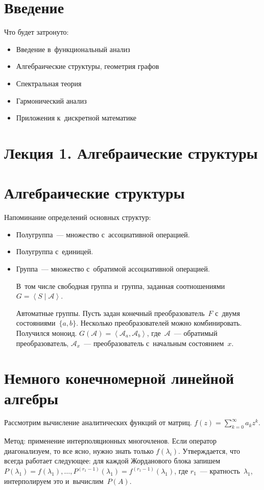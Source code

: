 \documentclass{article}
\begin{document}
\section{Введение}

Что будет затронуто:
\begin{itemize}
	\item Введение в~функциональный анализ
	\item Алгебраические структуры, геометрия графов
	\item Спектральная теория
	\item Гармонический анализ
	\item Приложения к~дискретной математике
\end{itemize}

\section*{Лекция 1. Алгебраические структуры}
\resetcntrs

\section{Алгебраические структуры}

\begin{definition} Напоминание определений основных структур:

\begin{itemize}
	\item Полугруппа~--- множество с~ассоциативной операцией.
	\item Полугруппа с~единицей.
	\item Группа~--- множество с~обратимой ассоциативной операцией.

		В~том числе свободная группа и~группа, заданная соотношениями $G =
		\left< S \mid \mathcal{A} \right>$.

		Автоматные группы. Пусть задан конечный преобразователь~$F$ с~двумя
		состояниями~$\{a, b\}$. Несколько преобразователей можно комбинировать.
		Получился моноид.
		$G(\mathcal{A}) = \left< \mathcal{A}_a, \mathcal{A}_b \right>$,
		где~$\mathcal{A}$~--- обратимый преобразователь, $\mathcal{A}_x$~---
		преобразователь с~начальным состоянием~$x$.
\end{itemize}
\end{definition}

\section{Немного конечномерной линейной алгебры}

Рассмотрим вычисление аналитических функций от матриц. $f(z) =
\sum\limits_{k=0}^\infty a_k z^k$.

Метод: применение интерполяционных многочленов. Если оператор диагонализуем,
то все ясно, нужно знать только $f(\lambda_i)$. Утверждается, что всегда
работает следующее: для каждой Жорданового блока запишем $P(\lambda_1) =
f(\lambda_1), \ldots, P^{(r_1 - 1)}(\lambda_1) = f^{(r_1 - 1)}(\lambda_1)$,
где $r_1$~--- кратность~$\lambda_1$, интерполируем это и~вычислим~$P(A)$.
\end{document}
